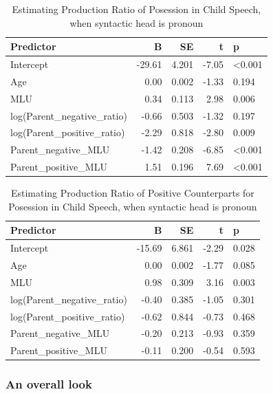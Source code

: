 \documentclass[
  english,
  man,floatsintext]{apa6}
\begin{document}
\begin{table}

\caption{\label{tab:unnamed-chunk-11}Estimating Production Ratio of Posession in Child Speech, when syntactic head is pronoun}
\centering
\begin{tabular}[t]{l|r|r|r|l}
\hline
Predictor & B & SE & t & p\\
\hline
Intercept & -29.61 & 4.201 & -7.05 & <0.001\\
\hline
Age & 0.00 & 0.002 & -1.33 & 0.194\\
\hline
MLU & 0.34 & 0.113 & 2.98 & 0.006\\
\hline
log(Parent\_negative\_ratio) & -0.66 & 0.503 & -1.32 & 0.197\\
\hline
log(Parent\_positive\_ratio) & -2.29 & 0.818 & -2.80 & 0.009\\
\hline
Parent\_negative\_MLU & -1.42 & 0.208 & -6.85 & <0.001\\
\hline
Parent\_positive\_MLU & 1.51 & 0.196 & 7.69 & <0.001\\
\hline
\end{tabular}
\end{table}

\begin{table}

\caption{\label{tab:unnamed-chunk-11}Estimating Production Ratio of Positive Counterparts for Posession in Child Speech, when syntactic head is pronoun}
\centering
\begin{tabular}[t]{l|r|r|r|l}
\hline
Predictor & B & SE & t & p\\
\hline
Intercept & -15.69 & 6.861 & -2.29 & 0.028\\
\hline
Age & 0.00 & 0.002 & -1.77 & 0.085\\
\hline
MLU & 0.98 & 0.309 & 3.16 & 0.003\\
\hline
log(Parent\_negative\_ratio) & -0.40 & 0.385 & -1.05 & 0.301\\
\hline
log(Parent\_positive\_ratio) & -0.62 & 0.844 & -0.73 & 0.468\\
\hline
Parent\_negative\_MLU & -0.20 & 0.213 & -0.93 & 0.359\\
\hline
Parent\_positive\_MLU & -0.11 & 0.200 & -0.54 & 0.593\\
\hline
\end{tabular}
\end{table}

\clearpage

\hypertarget{an-overall-look}{%
\subsubsection{An overall look}\label{an-overall-look}}
\end{document}

